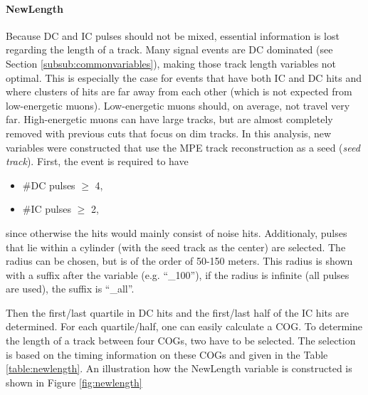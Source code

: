 \paragraph{NewLength}
Because DC and IC pulses should not be mixed, essential information is lost regarding the length of a track. Many signal events are DC dominated (see Section \ref{subsub:commonvariables}), making those track length variables not optimal. This is especially the case for events that have both IC and DC hits and where clusters of hits are far away from each other (which is not expected from low-energetic muons). Low-energetic muons should, on average, not travel very far. High-energetic muons can have large tracks, but are almost completely removed with previous cuts that focus on dim tracks. In this analysis, new variables were constructed that use the MPE track reconstruction as a seed (\textit{seed track}). First, the event is required to have 

\vspace{2mm}
\begin{itemize}
\item \#DC pulses $\geq$ 4,
\item \#IC pulses $\geq$ 2,
\end{itemize}
\vspace{2mm}
since otherwise the hits would mainly consist of noise hits. Additionaly,
pulses that lie within a cylinder (with the seed track as the center) are selected. The radius can be chosen, but is of the order of 50-150 meters. This radius is shown with a suffix after the variable (e.g. ``\_100''), if the radius is infinite (all pulses are used), the suffix is ``\_all''. 

Then the first/last quartile in DC hits and the first/last half of the IC hits are determined. For each quartile/half, one can easily calculate a COG. To determine the length of a track between four COGs, two have to be selected. The selection is based on the timing information on these COGs and given in the Table \ref{table:newlength}. An illustration how the NewLength variable is constructed is shown in Figure \ref{fig:newlength}\\

